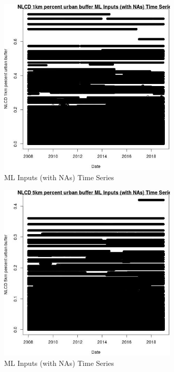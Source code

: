 \begin{figure} 
\centering  
\includegraphics[width=0.77\textwidth]{Code_Outputs/Report_ML_input_PM25_Step4_part_f_de_duplicated_aves_prioritize_24hr_obswNAs_NLCD_1km_percent_urban_buffervDate.jpg} 
\caption{\label{fig:Report_ML_input_PM25_Step4_part_f_de_duplicated_aves_prioritize_24hr_obswNAsNLCD_1km_percent_urban_buffervDate}ML Inputs (with NAs) Time Series} 
\end{figure} 
 

\clearpage 

\begin{figure} 
\centering  
\includegraphics[width=0.77\textwidth]{Code_Outputs/Report_ML_input_PM25_Step4_part_f_de_duplicated_aves_prioritize_24hr_obswNAs_NLCD_5km_percent_urban_buffervDate.jpg} 
\caption{\label{fig:Report_ML_input_PM25_Step4_part_f_de_duplicated_aves_prioritize_24hr_obswNAsNLCD_5km_percent_urban_buffervDate}ML Inputs (with NAs) Time Series} 
\end{figure} 
 

